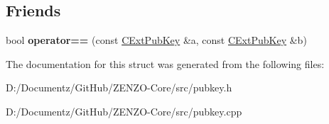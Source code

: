 \subsection*{Friends}
\begin{DoxyCompactItemize}
\item 
\mbox{\label{struct_c_ext_pub_key_a21fdc5351d6df62ce501f57bc1e1c9e6}} 
bool {\bfseries operator==} (const \mbox{\hyperlink{struct_c_ext_pub_key}{C\+Ext\+Pub\+Key}} \&a, const \mbox{\hyperlink{struct_c_ext_pub_key}{C\+Ext\+Pub\+Key}} \&b)
\end{DoxyCompactItemize}


The documentation for this struct was generated from the following files\+:\begin{DoxyCompactItemize}
\item 
D\+:/\+Documentz/\+Git\+Hub/\+Z\+E\+N\+Z\+O-\/\+Core/src/pubkey.\+h\item 
D\+:/\+Documentz/\+Git\+Hub/\+Z\+E\+N\+Z\+O-\/\+Core/src/pubkey.\+cpp\end{DoxyCompactItemize}
